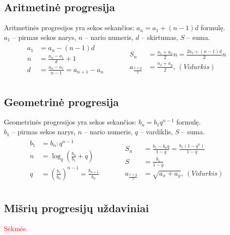 \documentclass[fleqn]{article} %
\begin{document}
\subsection{Aritmetinė progresija}
Aritmetinės progresijos yra sekos sekančios: $a_n = a_1 + (n - 1)d$ formulę. \\
$a_1$ -- pirmas sekos narys, $n$ -- nario numeris, $d$ -- skirtumas, $S$ -- suma.
\begin{align*}
    \begin{aligned}
    a_1 &= a_n - (n - 1)d \\
    n   &= \frac{a_n - a_1}{d} + 1 \\
    d   &= \frac{a_n - a_1}{n - 1} = a_{n + 1} - a_n \\
    \end{aligned}
    \quad\quad\quad
    \begin{aligned}
    S_n &= \frac{a_1 + a_n}{2}n = \frac{2a_1 + (n-1)d}{2} n \\
    a_{\frac{x + y}{2}} &= \frac{a_{x} + a_{y}}{2},\ (Vidurkis)
    \end{aligned}
\end{align*}

\subsection{Geometrinė progresija}

Geometrinės progresijos yra sekos sekančios: $b_n = b_1 q^{n - 1}$ formulę. \\
$b_1$ -- pirmas sekos narys, $n$ -- nario numeris, $q$ -- vardiklis, $S$ -- suma.
\begin{align*}
    \begin{aligned}
    b_1 &= b_n : q^{n - 1} \\
    n   &= \log_q{(\frac{b_n}{b_1} + q)} \\
    q   &= (\frac{b_1}{b_n})^{n - 1} = \frac{b_{n + 1}}{b_n} \\
    \end{aligned}
    \quad\quad\quad
    \begin{aligned}
    S_n &= \frac{b_1 - b_n q}{1 - q} = \frac{b_1(1 - q^n)}{1 - q} \\
    S   &= \frac{b_1}{1 - q} \\
    a_{\frac{x + y}{2}} &= \sqrt{a_{x} + a_{y}},\ (Vidurkis)
    \end{aligned}
\end{align*}


\subsection{Mišrių progresijų uždaviniai}
\textcolor{red}{Sėkmės.}
\end{document}
